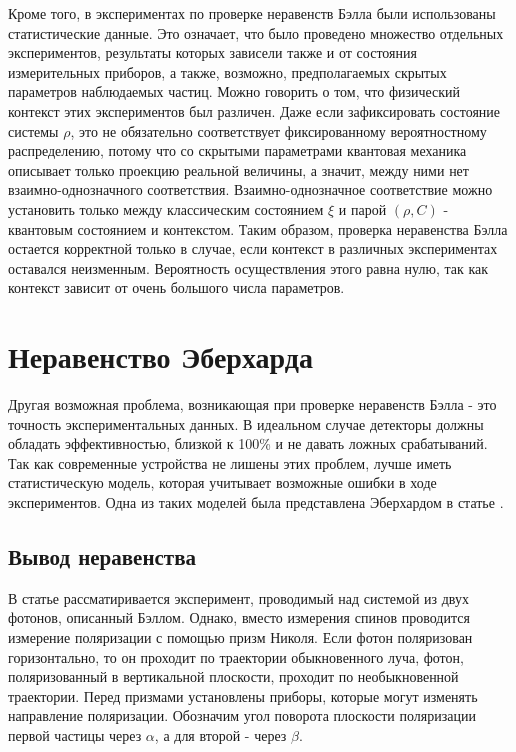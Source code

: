 \documentclass[%
master,         %
subf,           %
href,           %
colorlinks=true %
]{disser}
\numberwithin{equation}{section}
\numberwithin{figure}{section}
\begin{document}
Кроме того, в экспериментах по проверке неравенств Бэлла были использованы статистические данные. Это означает, что было проведено множество отдельных экспериментов, результаты которых зависели также и от состояния измерительных приборов, а также, возможно, предполагаемых скрытых параметров наблюдаемых частиц. Можно говорить о том, что физический контекст этих экспериментов был различен. Даже если зафиксировать состояние системы $\rho$, это не обязательно соответствует фиксированному вероятностному распределению, потому что со скрытыми параметрами квантовая механика описывает только проекцию реальной величины, а значит, между ними нет взаимно-однозначного соответствия. Взаимно-однозначное соответствие можно установить только между классическим состоянием $\xi$  и парой $(\rho, C)$ - квантовым состоянием и контекстом. Таким образом, проверка неравенства Бэлла остается корректной только в случае, если контекст в различных экспериментах оставался неизменным. Вероятность осуществления этого равна нулю, так как контекст зависит от очень большого числа параметров.

\section{Неравенство Эберхарда}
Другая возможная проблема, возникающая при проверке неравенств Бэлла - это точность экспериментальных данных. В идеальном случае детекторы должны обладать эффективностью, близкой к 100\% и не давать ложных срабатываний. Так как современные устройства не лишены этих проблем, лучше иметь статистическую модель, которая учитывает возможные ошибки в ходе экспериментов. Одна из таких моделей была представлена Эберхардом в статье \cite{Eberhard}.

\subsection{Вывод неравенства}

В статье рассматиривается эксперимент, проводимый над системой из двух фотонов, описанный Бэллом. Однако, вместо измерения спинов проводится измерение поляризации с помощью призм Николя. Если фотон поляризован горизонтально, то он проходит по траектории обыкновенного луча, фотон, поляризованный в вертикальной плоскости, проходит по необыкновенной траектории. Перед призмами установлены приборы, которые могут изменять направление поляризации. Обозначим угол поворота плоскости поляризации первой частицы через $\alpha$, а для второй - через $\beta$.
\end{document}
